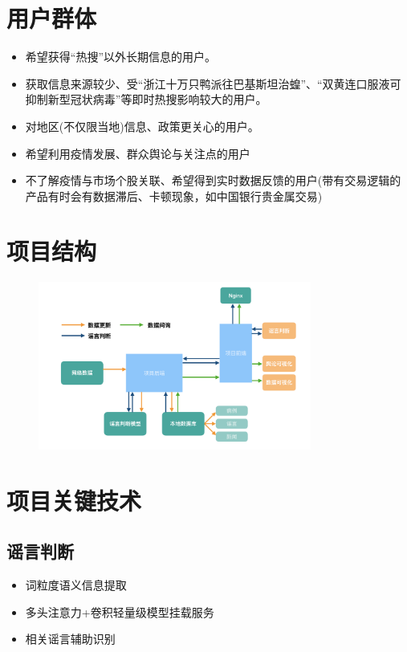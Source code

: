 \documentclass{article}
\begin{document}
\section{用户群体}
\begin{itemize}
	\item{希望获得“热搜”以外长期信息的用户。}
	\item{获取信息来源较少、受“浙江十万只鸭派往巴基斯坦治蝗”、“双黄连口服液可抑制新型冠状病毒”等即时热搜影响较大的用户。}
	\item{对地区(不仅限当地)信息、政策更关心的用户。}
	\item{希望利用疫情发展、群众舆论与关注点的用户}
	\item{不了解疫情与市场个股关联、希望得到实时数据反馈的用户(带有交易逻辑的产品有时会有数据滞后、卡顿现象，如中国银行贵金属交易)}
\end{itemize}

\section{项目结构}
\begin{figure}[H]
\centering
\includegraphics[width=0.8\textwidth]{pic3.png}
\end{figure}

\section{项目关键技术}
\subsection{谣言判断}
\begin{itemize}
	\item{词粒度语义信息提取}
	\item{多头注意力+卷积轻量级模型挂载服务}
	\item{相关谣言辅助识别}
\end{itemize}
\end{document}
